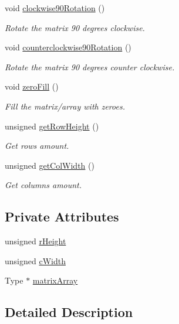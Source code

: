 \begin{DoxyCompactItemize}
void \mbox{\hyperlink{classMatrix2D_a2845ff86d7f24ccd338b42b2a9cbe017}{clockwise90\+Rotation}} ()
\begin{DoxyCompactList}\small\item\em Rotate the matrix 90 degrees clockwise. \end{DoxyCompactList}\item 
void \mbox{\hyperlink{classMatrix2D_a3fc1bc77793995134f6d2a9095eb57cb}{counterclockwise90\+Rotation}} ()
\begin{DoxyCompactList}\small\item\em Rotate the matrix 90 degrees counter clockwise. \end{DoxyCompactList}\item 
void \mbox{\hyperlink{classMatrix2D_a64929341625696e9500aa9b6d51a8ae6}{zero\+Fill}} ()
\begin{DoxyCompactList}\small\item\em Fill the matrix/array with zeroes. \end{DoxyCompactList}\item 
unsigned \mbox{\hyperlink{classMatrix2D_acc55ef0f69af583aaefb8a484b4c2ca7}{get\+Row\+Height}} ()
\begin{DoxyCompactList}\small\item\em Get rows amount. \end{DoxyCompactList}\item 
unsigned \mbox{\hyperlink{classMatrix2D_afd2fbe10a27044f6e716242fde6a645a}{get\+Col\+Width}} ()
\begin{DoxyCompactList}\small\item\em Get columns amount. \end{DoxyCompactList}\end{DoxyCompactItemize}
\subsection*{Private Attributes}
\begin{DoxyCompactItemize}
\item 
unsigned \mbox{\hyperlink{classMatrix2D_afdcd47964719a1c4e006fbdd313d2f17}{r\+Height}}
\item 
unsigned \mbox{\hyperlink{classMatrix2D_ad30f0f3c259aaa26ddda2b4d17eddef2}{c\+Width}}
\item 
Type $\ast$ \mbox{\hyperlink{classMatrix2D_a6e702a96baba89ad29226ceb44676e2b}{matrix\+Array}}
\end{DoxyCompactItemize}


\subsection{Detailed Description}

